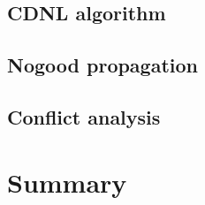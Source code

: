 \subsection{CDNL algorithm}

\subsection{Nogood propagation}

\subsection{Conflict analysis}

\section{Summary}

%
